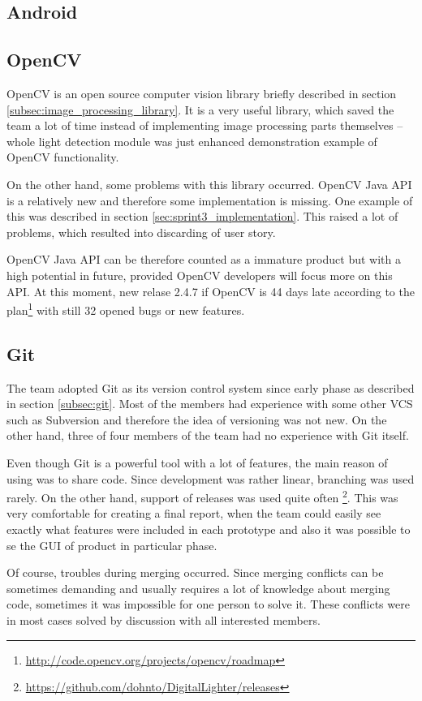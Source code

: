 \subsection{Android}

\subsection{OpenCV}
OpenCV is an open source computer vision library briefly described in section \ref{subsec:image_processing_library}.
It is a very useful library, which saved the team a lot of time instead of implementing image processing parts themselves
 -- whole light detection module was just enhanced demonstration example of OpenCV functionality.

On the other hand, some problems with this library occurred.
OpenCV Java API is a relatively new and therefore some implementation is missing.
One example of this was described in section \ref{sec:sprint3_implementation}.
This raised a lot of problems, which resulted into discarding of user story.

OpenCV Java API can be therefore counted as a immature product but with a high potential in future, provided OpenCV developers will focus more on this API.
At this moment, new relase 2.4.7 if OpenCV is 44 days late according to the plan\footnote{\url{http://code.opencv.org/projects/opencv/roadmap}} with still 32 opened bugs or new features.

\subsection{Git}
The team adopted Git as its version control system since early phase as described in section \ref{subsec:git}.
Most of the members had experience with some other VCS such as Subversion and therefore the idea of versioning was not new.
On the other hand, three of four members of the team had no experience with Git itself.

Even though Git is a powerful tool with a lot of features, the main reason of using was to share code.
Since development was rather linear, branching was used rarely.
On the other hand, support of releases was used quite often \footnote{\url{https://github.com/dohnto/DigitalLighter/releases}}.
This was very comfortable for creating a final report, when the team could easily see exactly what features were included in each prototype and also it was possible to se the GUI of product in particular phase.

Of course, troubles during merging occurred.
Since merging conflicts can be sometimes demanding and usually requires a lot of knowledge about merging code, sometimes it was impossible for one person to solve it.
These conflicts were in most cases solved by discussion with all interested members.

